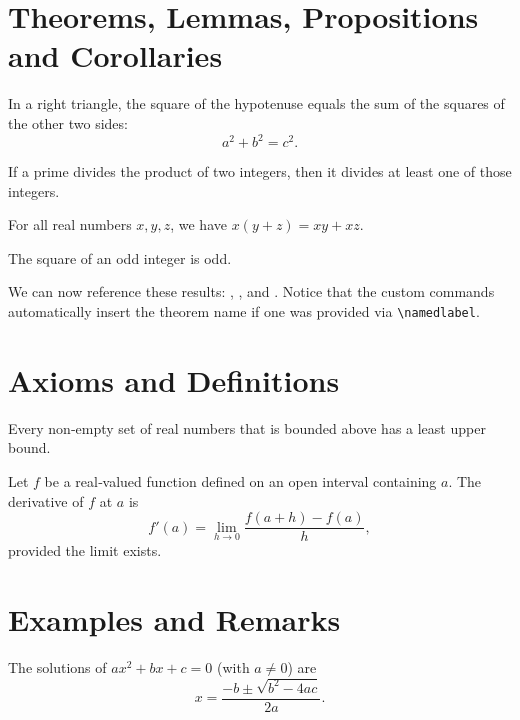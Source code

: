 \documentclass{myBook}
\begin{document}
\section{Theorems, Lemmas, Propositions and Corollaries}
\begin{theorem}
In a right triangle, the square of the hypotenuse equals the sum of the squares of the other two sides:
$$
a^2 + b^2 = c^2.
$$
\end{theorem}

\begin{lemma}
If a prime divides the product of two integers, then it divides at least one of those integers.
\end{lemma}

\begin{proposition}
For all real numbers $x, y, z$, we have $x(y+z) = xy + xz$.
\end{proposition}

\begin{corollary}
The square of an odd integer is odd.
\end{corollary}

We can now reference these results: , ,  and . Notice that the custom commands automatically insert the theorem name if one was provided via \texttt{\textbackslash namedlabel}.

\section{Axioms and Definitions}
\begin{axiom}
Every non‑empty set of real numbers that is bounded above has a least upper bound.
\end{axiom}

\begin{definition}[Derivative]
Let $f$ be a real‑valued function defined on an open interval containing $a$. The derivative of $f$ at $a$ is
$$
f'(a) = \lim_{h\to 0}\frac{f(a+h)-f(a)}{h},
$$
provided the limit exists.
\end{definition}

\section{Examples and Remarks}
\begin{example}
The solutions of $ax^2+bx+c=0$ (with $a\neq 0$) are
$$
x = \frac{-b \pm \sqrt{b^2-4ac}}{2a}.
$$
\end{example}
\end{document}
